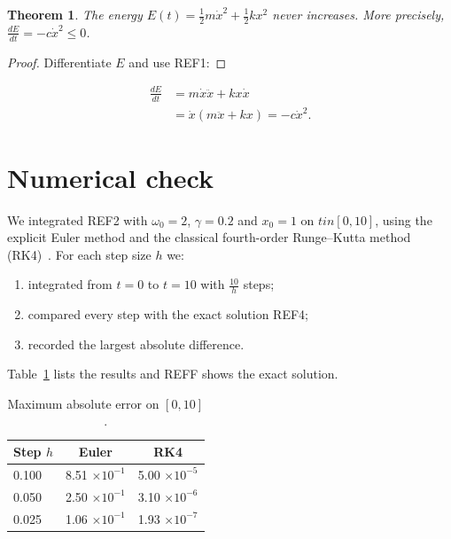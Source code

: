 \documentclass[11pt,a4paper]{article}
\newtheorem{theorem}{Theorem}
\begin{document}
\begin{theorem}
  The energy $E(t)=\frac{1}{2}m\dot{x}^{2}+\frac{1}{2}kx^{2}$ never increases. More precisely, $\frac{dE}{dt}=-c\dot{x}^{2}\leq0$.
\end{theorem}

\begin{proof}
  Differentiate $E$ and use REF1:
\end{proof}

\begin{align*}
  \frac{dE}{dt} &=m\dot{x}\ddot{x}+kx\dot{x} \\
   &=\dot{x}(m\ddot{x}+kx)=-c\dot{x}^{2}.
\end{align*}

\section{Numerical check}

We integrated REF2 with $\omega_{0}=2$, $\gamma=0.2$ and $x_{0}=1$ on $tin[0,10]$, using the explicit Euler method and the classical fourth-order Runge--Kutta method (RK4)~\cite{ref2}. For each step size $h$ we:

\begin{enumerate}
  \item integrated from $t=0$ to $t=10$ with $\frac{10}{h}$ steps;
  \item compared every step with the exact solution REF4;
  \item recorded the largest absolute difference.
\end{enumerate}

Table~\ref{tab:errors} lists the results and REFF shows the exact solution.

\begin{table}[htbp]
  \centering
  \caption{Maximum absolute error on $[0,10]$.}
  \label{tab:errors}
  \begin{tabular}{lcc}
    \toprule
    \textbf{Step $h$} & \textbf{Euler} & \textbf{RK4} \\
    \midrule
    0.100 & 8.51 $\times10^{-1}$ & 5.00 $\times10^{-5}$ \\
    0.050 & 2.50 $\times10^{-1}$ & 3.10 $\times10^{-6}$ \\
    0.025 & 1.06 $\times10^{-1}$ & 1.93 $\times10^{-7}$ \\
    \bottomrule
  \end{tabular}
\end{table}
\end{document}
